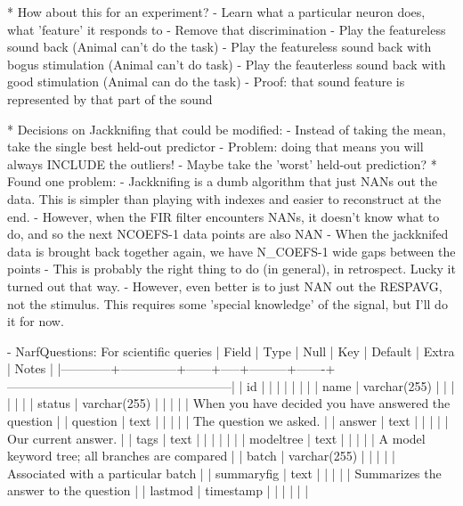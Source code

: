 {{* How about this for an experiment?
  - Learn what a particular neuron does, what 'feature' it responds to
  - Remove that discrimination
  - Play the featureless sound back (Animal can't do the task) 
  - Play the featureless sound back with bogus stimulation (Animal can't do task)
  - Play the feauterless sound back with good stimulation (Animal can do the task)
  - Proof: that sound feature is represented by that part of the sound

* Decisions on Jackknifing that could be modified:
  - Instead of taking the mean, take the single best held-out predictor
    - Problem: doing that means you will always INCLUDE the outliers!
  - Maybe take the 'worst' held-out prediction?
* Found one problem:
  - Jackknifing is a dumb algorithm that just NANs out the data. This is simpler than playing with indexes and easier to reconstruct at the end.
  - However, when the FIR filter encounters NANs, it doesn't know what to do, and so the next NCOEFS-1 data points are also NAN
  - When the jackknifed data is brought back together again, we have N_COEFS-1 wide gaps between the points
  - This is probably the right thing to do (in general), in retrospect. Lucky it turned out that way. 
  - However, even better is to just NAN out the RESPAVG, not the stimulus. This requires some 'special knowledge' of the signal, but I'll do it for now.

   - NarfQuestions: For scientific queries
     | Field      | Type         | Null | Key | Default | Extra | Notes                                                |
     |------------+--------------+------+-----+---------+-------+------------------------------------------------------|
     | id         |              |      |     |         |       |                                                      |
     | name       | varchar(255) |      |     |         |       |                                                      |
     | status     | varchar(255) |      |     |         |       | When you have decided you have answered the question |
     | question   | text         |      |     |         |       | The question we asked.                               |
     | answer     | text         |      |     |         |       | Our current answer.                                  |
     | tags       | text         |      |     |         |       |                                                      |
     | modeltree  | text         |      |     |         |       | A model keyword tree; all branches are compared      |
     | batch      | varchar(255) |      |     |         |       | Associated with a particular batch                   |
     | summaryfig | text         |      |     |         |       | Summarizes the answer to the question                |
     | lastmod    | timestamp    |      |     |         |       |                                                      |

}}
